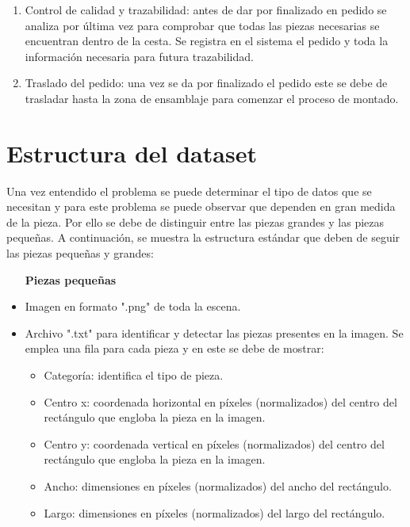 \begin{enumerate}
\begin{itemize}
\end{itemize}
\item Control de calidad y trazabilidad: antes de dar por finalizado en pedido se analiza por última vez para comprobar que todas las piezas necesarias se encuentran dentro de la cesta. Se registra en el sistema el pedido y toda la información necesaria para futura trazabilidad.
\item Traslado del pedido: una vez se da por finalizado el pedido este se debe de trasladar hasta la zona de ensamblaje para comenzar el proceso de montado.
\end{enumerate}

\section{Estructura del dataset}
\label{chap:Generación de un dataset sec:Estructura del dataset}
Una vez entendido el problema se puede determinar el tipo de datos que se necesitan y para este problema se puede observar que dependen en gran medida de la pieza. Por ello se debe de distinguir entre las piezas grandes y las piezas pequeñas. A continuación, se muestra la estructura estándar que deben de seguir las piezas pequeñas y grandes:

\noindent
\begin{itemize}[wide, nosep, labelindent = 0pt, topsep = 1ex]
\item[\textbf{Piezas pequeñas}]
\item Imagen en formato ".png" de toda la escena.
\item Archivo ".txt" para identificar y detectar las piezas presentes en la imagen. Se emplea una fila para cada pieza y en este se debe de mostrar:
\begin{itemize}
\item Categoría: identifica el tipo de pieza.
\item Centro x: coordenada horizontal en píxeles (normalizados) del centro del rectángulo que engloba la pieza en la imagen.
\item Centro y: coordenada vertical en píxeles (normalizados) del centro del rectángulo que engloba la pieza en la imagen.
\item Ancho: dimensiones en píxeles (normalizados) del ancho del rectángulo.
\item Largo: dimensiones en píxeles (normalizados) del largo del rectángulo.
\end{itemize}
\end{itemize}

